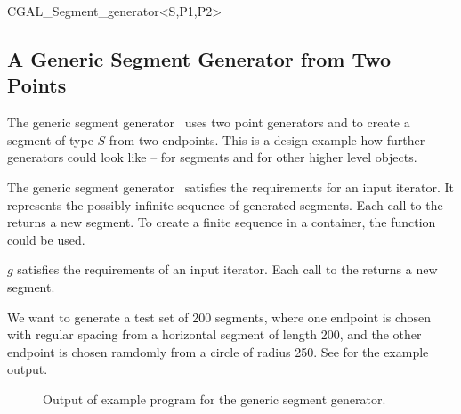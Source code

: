 \begin{ccClassTemplate}{CGAL_Segment_generator<S,P1,P2>}
\subsection{A Generic Segment Generator from Two Points}

\ccDefinition

The generic segment generator \ccClassTemplateName\ uses two point
generators  and  to create a segment of type $S$ from
two endpoints. This is a design example how further generators could
look like -- for segments and for other higher level objects.

The generic segment generator \ccClassTemplateName\  satisfies
the requirements for an input iterator. It represents the possibly
infinite sequence of generated segments. Each call to the
 returns a new segment. To create a finite sequence in
a container, the function  could be used.


\ccCreation


\ccOperations

$g$ satisfies the requirements of an input iterator. Each call to the
 returns a new segment. 

\ccExample

We want to generate a test set of 200 segments, where one endpoint is
chosen with regular spacing from a horizontal segment of length 200,
and the other endpoint is chosen ramdomly from a circle of radius
250. See  for the example output.

\begin{ccTexOnly}
  \begin{figure}
    \noindent
    \hspace*{0.025\textwidth}%
    \begin{minipage}{0.45\textwidth}%
      \caption{Output of example program for the generic segment generator.}
      \label{figureSegmentGenerator}
    \end{minipage}%
  \end{figure}
\end{ccTexOnly}


\end{ccClassTemplate}
